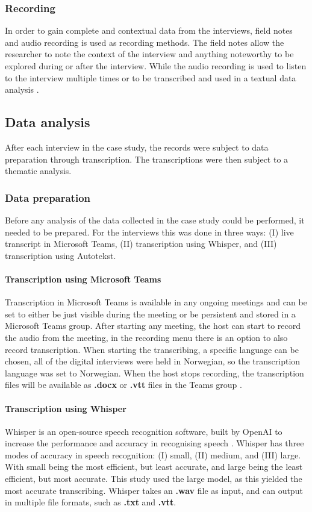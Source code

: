 \subsubsection{Recording}
In order to gain complete and contextual data from the interviews, field notes and audio recording is used as recording methods. The field notes allow the researcher to note the context of the interview and anything noteworthy to be explored during or after the interview. While the audio recording is used to listen to the interview multiple times or to be transcribed and used in a textual data analysis \cite{bjo_2022}.

\subsection{Data analysis}
After each interview in the case study, the records were subject to data preparation through transcription. The transcriptions were then subject to a thematic analysis.

\subsubsection{Data preparation}
Before any analysis of the data collected in the case study could be performed, it needed to be prepared. For the interviews this was done in three ways: (I) live transcript in Microsoft Teams, (II) transcription using Whisper, and (III) transcription using Autotekst.

\paragraph{Transcription using Microsoft Teams}
Transcription in Microsoft Teams is available in any ongoing meetings and can be set to either be just visible during the meeting or be persistent and stored in a Microsoft Teams group. After starting any meeting, the host can start to record the audio from the meeting, in the recording menu there is an option to also record transcription. When starting the transcribing, a specific language can be chosen, all of the digital interviews were held in Norwegian, so the transcription language was set to Norwegian. When the host stops recording, the transcription files will be available as \textbf{.docx} or \textbf{.vtt} files in the Teams group \cite{mt_2022}.

\paragraph{Transcription using Whisper}
Whisper is an open-source speech recognition software, built by OpenAI to increase the performance and accuracy in recognising speech \cite{oa_2022}. Whisper has three modes of accuracy in speech recognition: (I) small, (II) medium, and (III) large. With small being the most efficient, but least accurate, and large being the least efficient, but most accurate. This study used the large model, as this yielded the most accurate transcribing. Whisper takes an \textbf{.wav} file as input, and can output in multiple file formats, such as \textbf{.txt} and \textbf{.vtt}.

